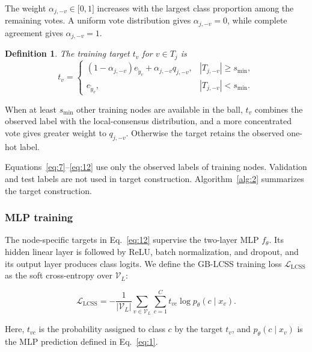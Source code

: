 \documentclass[10pt,letterpaper,nopreprintline]{elsarticle}
\theoremstyle{plain}
\newtheorem{definition}{Definition}
\begin{document}
The weight \(\alpha_{j, - v} \in \lbrack 0,1\rbrack\) increases with the largest class proportion among the remaining votes. A uniform vote distribution gives \(\alpha_{j, - v} = 0\), while complete agreement gives \(\alpha_{j, - v} = 1\).

\Needspace{64pt}

\begin{definition}
The training target \(t_{v}\) for \(v \in T_{j}\) is
\begin{equation}\label{eq:12}
t_{v} = \begin{cases}
(1 - \alpha_{j, - v})e_{{\widetilde{y}}_{v}} + \alpha_{j, - v}q_{j, - v}, & |T_{j, - v}| \geq s_{\min}, \\
e_{{\widetilde{y}}_{v}}, & |T_{j, - v}| < s_{\min}.
\end{cases}
\end{equation}
\end{definition}

When at least \(s_{\min}\) other training nodes are available in the ball, \(t_{v}\) combines the observed label with the local-consensus distribution, and a more concentrated vote gives greater weight to \(q_{j, - v}\). Otherwise the target retains the observed one-hot label.

Equations~\eqref{eq:7}--\eqref{eq:12} use only the observed labels of training nodes. Validation and test labels are not used in target construction. Algorithm~\ref{alg:2} summarizes the target construction.



\subsubsection{MLP training}\label{sec:3.3.3}

The node-specific targets in Eq.~\eqref{eq:12} supervise the two-layer MLP \(f_{\theta}\). Its hidden linear layer is followed by ReLU, batch normalization, and dropout, and its output layer produces class logits. We define the GB-LCSS training loss \(\mathcal{L}_{\mathrm{LCSS}}\) as the soft cross-entropy over \(\mathcal{V}_{L}\):

\begin{equation}\label{eq:13}
\mathcal{L}_{\mathrm{LCSS}} = - \frac{1}{|\mathcal{V}_{L}|}\sum_{v \in \mathcal{V}_{L}}{\sum_{c = 1}^{C}t_{vc}}\log p_{\theta}(c \mid x_{v}).
\end{equation}

Here, \(t_{vc}\) is the probability assigned to class \(c\) by the target \(t_{v}\), and \(p_{\theta}\left( c \mid x_{v} \right)\) is the MLP prediction defined in Eq.~\eqref{eq:1}.
\end{document}
